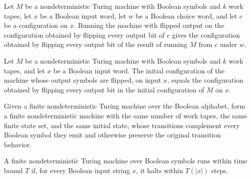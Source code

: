 \begin{theorem}
\label{Turing.NDTM.flipOutput_runWith}
\leanok
{}
Let $M$ be a nondeterministic Turing machine with Boolean symbols and $k$ work tapes,
let $x$ be a Boolean input word, let $w$ be a Boolean choice word, and let $c$ be a
configuration on $x$. Running the machine with flipped output on the configuration
obtained by flipping every output bit of $c$ gives the configuration obtained by
flipping every output bit of the result of running $M$ from $c$ under $w$.
\end{theorem}

\begin{theorem}
\label{Turing.NDTM.flipOutput_initCfg}
\leanok
{}
Let $M$ be a nondeterministic Turing machine with Boolean symbols and $k$ work tapes,
and let $x$ be a Boolean input word. The initial configuration of the machine whose
output symbols are flipped, on input $x$, equals the configuration obtained by flipping
every output bit in the initial configuration of $M$ on $x$.
\end{theorem}

\begin{definition}
\label{Turing.FinNDTM.flipOutput}
\leanok
{}
Given a finite nondeterministic Turing machine over the Boolean alphabet, form a finite
nondeterministic machine with the same number of work tapes, the same finite state set,
and the same initial state, whose transitions complement every Boolean symbol they emit
and otherwise preserve the original transition behavior.
\end{definition}

\begin{definition}
\label{Turing.FinNDTM.RunsInTime}
\leanok
{}
A finite nondeterministic Turing machine over Boolean symbols runs within time bound $T$
if, for every Boolean input string $x$, it halts within $T(|x|)$ steps.
\end{definition}

